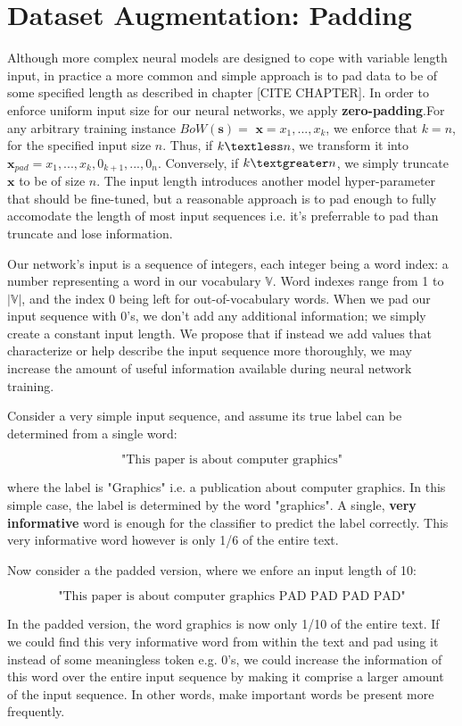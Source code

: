 \section{Dataset Augmentation: Padding}

Although more complex neural models are designed to cope with variable length input,
in practice a more common and simple approach is to pad data to be of some specified
length as described in chapter [CITE CHAPTER].
In order to enforce uniform input size for our neural networks,
we apply \textbf{zero-padding}.For any arbitrary training instance $BoW(\bm{s})=$ $\bm{x} = x_1,...,x_k$, we enforce that $k = n$, for the specified input size
$n$. Thus, if $k \textless n$, we transform it into $\bm{x}_{pad} = x_1,...,x_k, 0_{k+1}, ..., 0_{n}$. Conversely, if
$k \textgreater n$, we simply truncate $\bm{x}$ to be of size $n$. The input length introduces another model hyper-parameter
that should be fine-tuned, but a reasonable approach is to pad enough to fully accomodate
the length of most input sequences i.e. it’s preferrable to pad than truncate and lose
information.

Our network's input is a sequence of integers, each integer being a word index: a number representing a word in our vocabulary $\mathbb{V}$.
Word indexes range from 1 to $|\mathbb{V}|$, and the index 0 being left for out-of-vocabulary words.
When we pad our input sequence with 0’s, we don’t add any additional information; we
simply create a constant input length. We propose that if instead we add values that characterize or help
describe the input sequence more thoroughly, we may increase the amount of useful information
available during neural network training.

Consider a very simple input sequence, and assume its true label can be determined
from a single word:

\[\text{"This paper is about computer graphics"}\]

where the label is "Graphics" i.e. a publication about computer graphics.
In this simple case, the label is determined by the word "graphics". A single, \textbf{very
informative} word is enough for the classifier to predict the label correctly. This very
informative word however is only 1/6 of the entire text.

Now consider a the padded version, where we enfore an input length of 10:

\[\text{"This paper is about computer graphics PAD PAD PAD PAD"}\]

In the padded version, the word graphics is now only 1/10 of the entire text. If we
could find this very informative word from within the text and pad using it instead of some
meaningless token e.g. 0's, we could increase the information of this word over the entire
input sequence by making it comprise a larger amount of the input sequence. In other
words, make important words be present more frequently.

